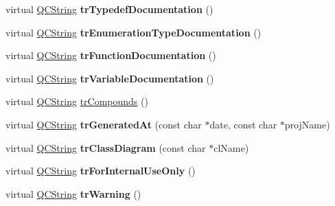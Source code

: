 \begin{DoxyCompactItemize}
\item 
\hypertarget{class_translator_swedish_a284d8febafa52e730c3f929a1f17f166}{virtual \hyperlink{class_q_c_string}{Q\-C\-String} {\bfseries tr\-Typedef\-Documentation} ()}\label{class_translator_swedish_a284d8febafa52e730c3f929a1f17f166}

\item 
\hypertarget{class_translator_swedish_a03114d3cc3330b921600693ad71adc2f}{virtual \hyperlink{class_q_c_string}{Q\-C\-String} {\bfseries tr\-Enumeration\-Type\-Documentation} ()}\label{class_translator_swedish_a03114d3cc3330b921600693ad71adc2f}

\item 
\hypertarget{class_translator_swedish_a8dc8036d97f4f5406392646044d5af7e}{virtual \hyperlink{class_q_c_string}{Q\-C\-String} {\bfseries tr\-Function\-Documentation} ()}\label{class_translator_swedish_a8dc8036d97f4f5406392646044d5af7e}

\item 
\hypertarget{class_translator_swedish_aa3ed4d30194d5ad2ae633df2d91e4bcd}{virtual \hyperlink{class_q_c_string}{Q\-C\-String} {\bfseries tr\-Variable\-Documentation} ()}\label{class_translator_swedish_aa3ed4d30194d5ad2ae633df2d91e4bcd}

\item 
virtual \hyperlink{class_q_c_string}{Q\-C\-String} \hyperlink{class_translator_swedish_a603472da4b3038d38d1f322fa07c580e}{tr\-Compounds} ()
\item 
\hypertarget{class_translator_swedish_a4fdf6d63541eaaa48cd09fd9ffdf2bec}{virtual \hyperlink{class_q_c_string}{Q\-C\-String} {\bfseries tr\-Generated\-At} (const char $\ast$date, const char $\ast$proj\-Name)}\label{class_translator_swedish_a4fdf6d63541eaaa48cd09fd9ffdf2bec}

\item 
\hypertarget{class_translator_swedish_a5650582c9e4157837fa0a32b75772947}{virtual \hyperlink{class_q_c_string}{Q\-C\-String} {\bfseries tr\-Class\-Diagram} (const char $\ast$cl\-Name)}\label{class_translator_swedish_a5650582c9e4157837fa0a32b75772947}

\item 
\hypertarget{class_translator_swedish_afd682dc33a99dbe52d3d56cace1a4378}{virtual \hyperlink{class_q_c_string}{Q\-C\-String} {\bfseries tr\-For\-Internal\-Use\-Only} ()}\label{class_translator_swedish_afd682dc33a99dbe52d3d56cace1a4378}

\item 
\hypertarget{class_translator_swedish_a30dfe9a37c224d94a44acf885cfec685}{virtual \hyperlink{class_q_c_string}{Q\-C\-String} {\bfseries tr\-Warning} ()}\label{class_translator_swedish_a30dfe9a37c224d94a44acf885cfec685}


\end{DoxyCompactItemize}
